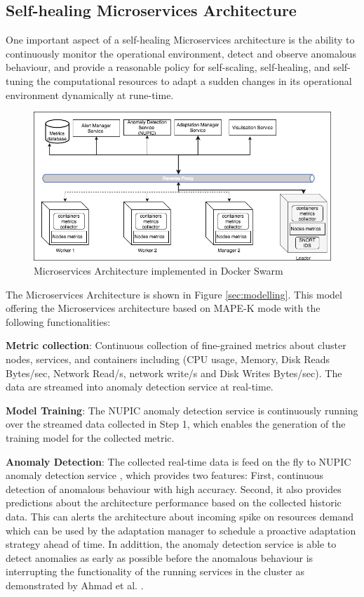 \documentclass[graybox]{svmult}
\begin{document}
\subsection{Self-healing Microservices Architecture}
One important aspect of a self-healing Microservices architecture is the ability to continuously monitor the operational environment, detect and observe anomalous behaviour, and provide a reasonable policy for self-scaling, self-healing, and self-tuning the computational resources to adapt a sudden changes in its operational environment dynamically at rune-time.  
\begin{figure}[!ht] 
\includegraphics[scale=0.4]{design.png}
\caption{Microservices Architecture implemented in Docker Swarm}
\label{fig_model}
\end{figure}


 
The Microservices Architecture is shown in Figure \ref{sec:modelling}. This model offering the Microservices architecture based on MAPE-K mode \cite{computing2006architectural} with the following functionalities: 

\textbf{Metric collection}: Continuous collection of fine-grained metrics about cluster nodes, services, and containers including (CPU usage, Memory, Disk Reads Bytes/sec, Network Read/s, network write/s and Disk Writes Bytes/sec). The data are streamed into anomaly detection service at real-time. 

\textbf{Model Training}: The NUPIC anomaly detection service \cite{AHMAD2017134} is continuously running over the streamed data collected in Step 1, which enables the generation of the training model for the collected metric.  

\textbf{Anomaly Detection}: The collected real-time data is feed on the fly to NUPIC anomaly detection service \cite{AHMAD2017134}, which provides two features: First, continuous detection of anomalous behaviour with high accuracy. Second, it also provides predictions about the architecture performance based on the collected historic data. This can alerts the architecture about incoming spike on resources demand which can be used by the adaptation manager to schedule a proactive adaptation strategy ahead of time. In addittion, the anomaly detection service is able to detect anomalies as early as possible before the anomalous behaviour is interrupting the functionality of the running services in the cluster as demonstrated by Ahmad et al. \cite{AHMAD2017134}. 
\end{document}
